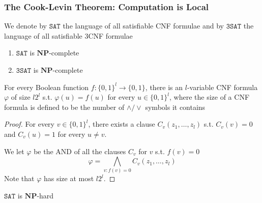 \documentclass[11pt]{article}
\def \NP {\textbf{NP}}
\def \NP {\textbf{NP}}
\def \SAT {\texttt{SAT}}
\def \TSAT {\texttt{3SAT}}
\begin{document}
\subsubsection{The Cook-Levin Theorem: Computation is Local}
\label{sec:org8506536}
We denote by \(\SAT\) the language of all satisfiable CNF formulae and by \(\TSAT\) the
language of all satisfiable 3CNF formulae

\begin{theorem}
\label{thm2.10}
\begin{enumerate}
\item \(\SAT\) is \(\NP\)-complete
\item \(\TSAT\) is \(\NP\)-complete
\end{enumerate}
\end{theorem}

\begin{lemma}
\label{lemma2.13}
For every Boolean function \(f:\{0,1\}^l\to\{0,1\}\), there is an \(l\)-variable CNF formula \(\varphi\)
of size \(l2^l\) s.t. \(\varphi(u)=f(u)\) for every \(u\in\{0,1\}^l\), where the size of a CNF
formula is defined to be the number of \(\wedge/\vee\) symbols it contains
\end{lemma}

\begin{proof}
For every \(v\in\{0,1\}^l\), there exists a clause \(C_v(z_1,\dots,z_l)\) s.t. \(C_v(v)=0\)
and \(C_v(u)=1\) for every \(u\neq v\).

We let \(\varphi\) be the AND of all the clauses \(C_v\) for \(v\) s.t. \(f(v)=0\)
     \begin{equation*}
\varphi=\bigwedge_{v:f(v)=0}C_v(z_1,\dots,z_l)
     \end{equation*}
Note that \(\varphi\) has size at most \(l2^l\).
\end{proof}

\begin{lemma}[]
\(\SAT\) is \(\NP\)-hard
\end{lemma}
\end{document}
